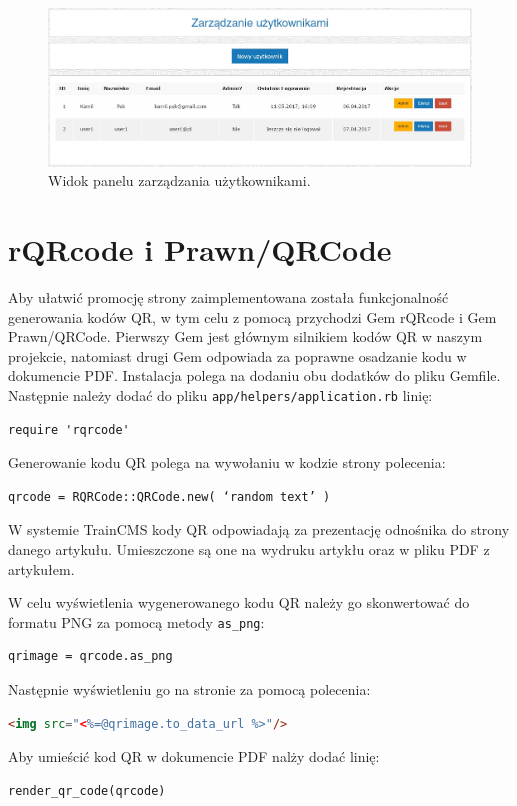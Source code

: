 \documentclass[openright]{xmgr}
\begin{document}
\begin{figure}[!tbh]
\centering
\includegraphics[width=\linewidth]{fig/uzytkownicy}
\caption{Widok panelu zarządzania użytkownikami.}
\end{figure}

\newpage

\section{rQRcode i Prawn/QRCode}
Aby ułatwić promocję strony zaimplementowana została funkcjonalność generowania kodów QR, w tym celu z pomocą przychodzi Gem rQRcode\cite{rqrcode} i Gem Prawn/QRCode\cite{prawnqr}. Pierwszy Gem jest głównym silnikiem kodów QR w naszym projekcie, natomiast drugi Gem odpowiada za poprawne osadzanie kodu w dokumencie PDF. Instalacja polega na dodaniu obu dodatków do pliku Gemfile. Następnie należy dodać do pliku  \texttt{app/helpers/application.rb} linię:
\begin{lstlisting}[language=ruby2, caption={Kod dołączający rQRcode do projektu}]
require 'rqrcode'
\end{lstlisting}
Generowanie kodu QR polega na wywołaniu w kodzie strony polecenia:
\begin{lstlisting}[language=ruby2, caption={Kod generujący kod QR}]
qrcode = RQRCode::QRCode.new( ‘random text’ )
\end{lstlisting}

W systemie TrainCMS kody QR odpowiadają za prezentację odnośnika do strony danego artykułu. Umieszczone są one na wydruku artykłu oraz w pliku PDF z artykułem.

W celu wyświetlenia wygenerowanego kodu QR należy go skonwertować do formatu PNG za pomocą metody \texttt{as\_png}:
\begin{lstlisting}[language=ruby2, caption={Kod konwertujący kod QR}]
qrimage = qrcode.as_png
\end{lstlisting}
Następnie wyświetleniu go na stronie za pomocą polecenia:
\begin{lstlisting}[language=html, caption={Kod wyświetlający kod QR na stronie HTML}]
<img src="<%=@qrimage.to_data_url %>"/>
\end{lstlisting}
Aby umieścić kod QR w dokumencie PDF nalży dodać linię:
\begin{lstlisting}[language=ruby2, caption={Kod wyświetlający kod QR w dokumencie PDF}]
render_qr_code(qrcode)
\end{lstlisting}
\end{document}
